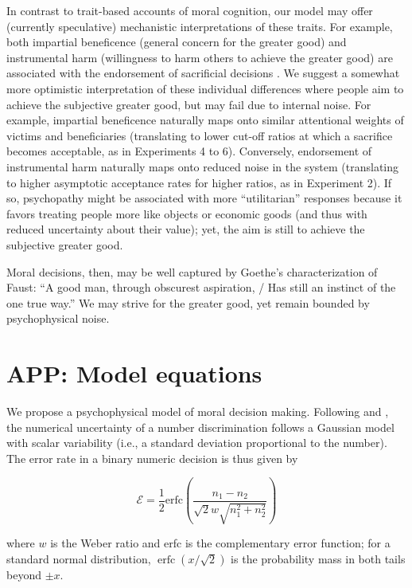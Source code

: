 \documentclass[
]{article}
\begin{document}
In contrast to trait-based accounts of moral cognition, our model may offer (currently speculative) mechanistic interpretations of these traits. For example, both impartial beneficence (general concern for the greater good) and instrumental harm (willingness to harm others to achieve the greater good) are associated with the endorsement of sacrificial decisions \autocite{Kahane2018}. We suggest a somewhat more optimistic interpretation of these individual differences where people aim to achieve the subjective greater good, but may fail due to internal noise. For example, impartial beneficence naturally maps onto similar attentional weights of victims and beneficiaries (translating to lower cut-off ratios at which a sacrifice becomes acceptable, as in Experiments 4 to 6). Conversely, endorsement of instrumental harm naturally maps onto reduced noise in the system (translating to higher asymptotic acceptance rates for higher ratios, as in Experiment 2). If so, psychopathy might be associated with more ``utilitarian'' responses \autocite{Kahane2015} because it favors treating people more like objects or economic goods (and thus with reduced uncertainty about their value); yet, the aim is still to achieve the subjective greater good.

Moral decisions, then, may be well captured by Goethe's characterization of Faust: ``A good man, through obscurest aspiration, / Has still an instinct of the one true way.'' We may strive for the greater good, yet remain bounded by psychophysical noise.

\clearpage

\section{APP: Model equations}\label{app:model-equations}

We propose a psychophysical model of moral decision making. Following \autocite{Pica2004} and \autocite{Halberda2008}, the numerical uncertainty of a number discrimination follows a Gaussian model with scalar variability (i.e., a standard deviation proportional to the number). The error rate in a binary numeric decision is thus given by

\[\mathcal{E} = \frac{1}{2} \text{erfc}\left(\frac{n_1 - n_2}{\sqrt{2}w\sqrt{n_1^2 + n_2^2}}\right)\]

where \(w\) is the Weber ratio and erfc is the complementary error function; for a standard normal distribution, \(\operatorname{erfc}(x/\sqrt{2})\) is the probability mass in both tails beyond \(\pm x\).
\end{document}
